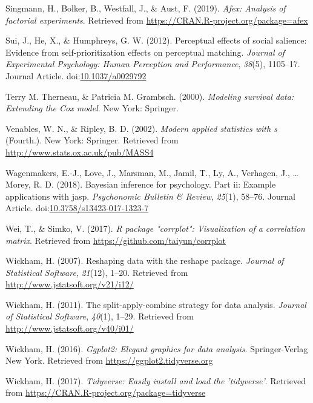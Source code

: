 \documentclass[
  man]{apa6}
\begin{document}
\leavevmode\hypertarget{ref-R-afex}{}%
Singmann, H., Bolker, B., Westfall, J., \& Aust, F. (2019). \emph{Afex: Analysis of factorial experiments}. Retrieved from \url{https://CRAN.R-project.org/package=afex}

\leavevmode\hypertarget{ref-Sui_2012_JEPHPP}{}%
Sui, J., He, X., \& Humphreys, G. W. (2012). Perceptual effects of social salience: Evidence from self-prioritization effects on perceptual matching. \emph{Journal of Experimental Psychology: Human Perception and Performance}, \emph{38}(5), 1105--17. Journal Article. doi:\href{https://doi.org/10.1037/a0029792}{10.1037/a0029792}

\leavevmode\hypertarget{ref-R-survival-book}{}%
Terry M. Therneau, \& Patricia M. Grambsch. (2000). \emph{Modeling survival data: Extending the Cox model}. New York: Springer.

\leavevmode\hypertarget{ref-R-MASS}{}%
Venables, W. N., \& Ripley, B. D. (2002). \emph{Modern applied statistics with s} (Fourth.). New York: Springer. Retrieved from \url{http://www.stats.ox.ac.uk/pub/MASS4}

\leavevmode\hypertarget{ref-Wagenmakers_2018_JASP}{}%
Wagenmakers, E.-J., Love, J., Marsman, M., Jamil, T., Ly, A., Verhagen, J., \ldots{} Morey, R. D. (2018). Bayesian inference for psychology. Part ii: Example applications with jasp. \emph{Psychonomic Bulletin \& Review}, \emph{25}(1), 58--76. Journal Article. doi:\href{https://doi.org/10.3758/s13423-017-1323-7}{10.3758/s13423-017-1323-7}

\leavevmode\hypertarget{ref-R-corrplot2017}{}%
Wei, T., \& Simko, V. (2017). \emph{R package "corrplot": Visualization of a correlation matrix}. Retrieved from \url{https://github.com/taiyun/corrplot}

\leavevmode\hypertarget{ref-R-reshape2}{}%
Wickham, H. (2007). Reshaping data with the reshape package. \emph{Journal of Statistical Software}, \emph{21}(12), 1--20. Retrieved from \url{http://www.jstatsoft.org/v21/i12/}

\leavevmode\hypertarget{ref-R-plyr}{}%
Wickham, H. (2011). The split-apply-combine strategy for data analysis. \emph{Journal of Statistical Software}, \emph{40}(1), 1--29. Retrieved from \url{http://www.jstatsoft.org/v40/i01/}

\leavevmode\hypertarget{ref-R-ggplot2}{}%
Wickham, H. (2016). \emph{Ggplot2: Elegant graphics for data analysis}. Springer-Verlag New York. Retrieved from \url{https://ggplot2.tidyverse.org}

\leavevmode\hypertarget{ref-R-tidyverse}{}%
Wickham, H. (2017). \emph{Tidyverse: Easily install and load the 'tidyverse'}. Retrieved from \url{https://CRAN.R-project.org/package=tidyverse}
\end{document}
